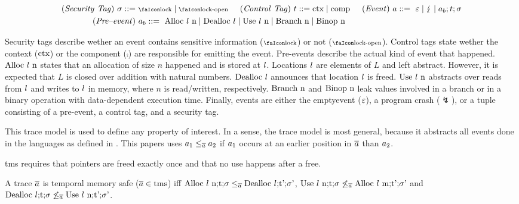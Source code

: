 \documentclass[utf8,acmsmall,review,screen,dvipsnames]{acmart}
\begin{document}
\begin{gather*}
  \begin{aligned}
  \mi{(Security\ Tag)}~\sigma\bnfdef&\ \lock \mid \unlock\hspace{0.5cm}
  \mi{(Control\ Tag)}~\sandboxtag\bnfdef \ctx\mid\comp\hspace{0.5cm}
  \mi{(Event)}~\event\bnfdef\ \emptyevent \mid \lightning \mid \event[_{b}];\sandboxtag;\sigma \\
  \mi{(Pre\text{--}event)}&~\event[_{b}]\bnfdef\ \ev{Alloc\ \loc\ n} \mid \ev{Dealloc\ \loc} \mid \ev{Use\ \loc\ n} \mid \ev{Branch\ n} \mid \ev{Binop\ n} \\
  \end{aligned}
\end{gather*}

Security tags describe wether an event contains sensitive information ($\lock$) or not ($\unlock$).
Control tags state wether the context ($\ctx$) or the component ($\comp$) are responsible for emitting the event.
Pre-events describe the actual kind of event that happened.
$\ev{Alloc\ \loc\ n}$ states that an allocation of size $n$ happened and is stored at $\loc$.
Locations $\loc$ are elements of $L$ and left abstract.
However, it is expected that $L$ is closed over addition with natural numbers.
$\ev{Dealloc\ \loc}$ announces that location $\loc$ is freed.
$\ev{Use\ \loc\ n}$ abstracts over reads from $\loc$ and writes to $\loc$ in memory, where $n$ is read/written, respectively.
$\ev{Branch\ n}$ and $\ev{Binop\ n}$ leak values involved in a branch or in a binary operation with data-dependent execution time.
Finally, events are either the emptyevent ($\emptyevent$), a program crash ($\lightning$), or a tuple consisting of a pre-event, a control tag, and a security tag.

This trace model is used to define any property of interest.
In a sense, the trace model is most general, because it abstracts all events done in the languages as defined in .
This papers uses $\event[_{1}]\le_{\trace}\event[_{2}]$ if $\event[_{1}]$ occurs at an earlier position in $\trace$ than $\event[_{2}]$.

\gls{tms} requires that pointers are freed exactly once and that no use happens after a free.

\begin{definition}\label{def:trace:tmsdef}
  A trace $\trace$ is temporal memory safe ($\trace\in\tmssafe$) iff $\ev{Alloc\ \loc\ n;\sandboxtag;\securitytag}\le_{\trace}\ev{Dealloc\ \loc;\sandboxtag';\securitytag'}$, $\ev{Use\ \loc\ n;\sandboxtag;\securitytag}\not\le_{\trace}\ev{Alloc\ \loc\ m;\sandboxtag';\securitytag'}$ and $\ev{Dealloc\ \loc;\sandboxtag;\securitytag}\not\le_{\trace}\ev{Use\ \loc\ n;\sandboxtag';\securitytag'}$.
\end{definition}
\end{document}
